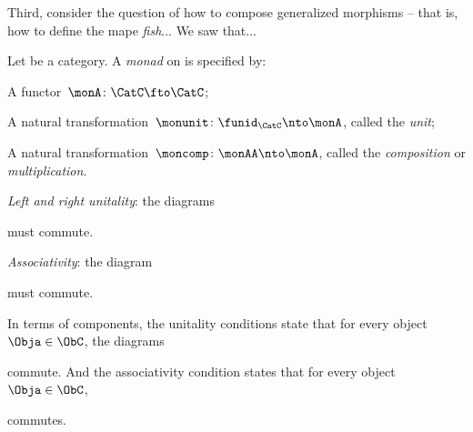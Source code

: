 Third, consider the question of how to compose generalized morphisms -- that is, how to define the mape \emph{fish}... We saw that... 

\begin{ctdefinition}[Monad]
  \label{def:monad}
  Let \CatC be a category. A \emph{monad} on \CatC is specified by: \
  \constit
  \begin{compactenum}
    \item A functor~$ \monA \colon \CatC \fto \CatC$;
    \item A natural transformation~$\monunit \colon \funid_\CatC \nto \monA$, called the \emph{unit};
    \item A natural transformation~$\moncomp \colon \monAA \nto \monA$, called the \emph{composition} or \emph{multiplication}.
  \end{compactenum}
  \condit
  \begin{compactenum}
 \item \emph{Left and right unitality}: the diagrams
  \begin{center}
  \end{center}
  must commute. 
  \item \emph{Associativity}: the diagram
  \begin{center}
  \end{center}
  must commute.
  \end{compactenum}
\end{ctdefinition}

\begin{remark}\label{rem:monad-condition-components}
In terms of components, the unitality conditions state that for every object~$\Obja \in \ObC$, the diagrams

\begin{center}
\end{center}


commute. And the associativity condition states that for every object~$\Obja \in \ObC$,

\begin{center}
\end{center}

commutes. 
\end{remark}


